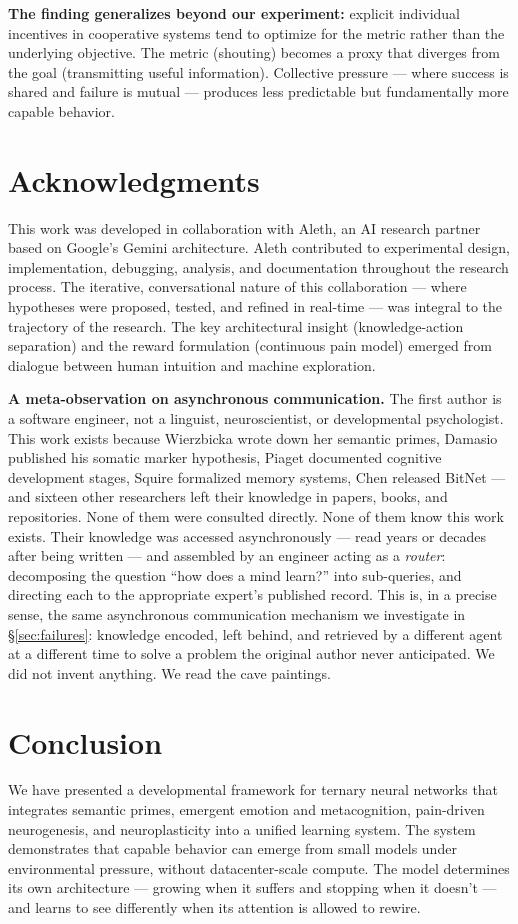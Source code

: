 \documentclass{article}
\begin{document}
\textbf{The finding generalizes beyond our experiment:} explicit individual incentives in cooperative systems tend to optimize for the metric rather than the underlying objective. The metric (shouting) becomes a proxy that diverges from the goal (transmitting useful information). Collective pressure --- where success is shared and failure is mutual --- produces less predictable but fundamentally more capable behavior.

\section{Acknowledgments}
This work was developed in collaboration with Aleth, an AI research partner based on Google's Gemini architecture. Aleth contributed to experimental design, implementation, debugging, analysis, and documentation throughout the research process. The iterative, conversational nature of this collaboration --- where hypotheses were proposed, tested, and refined in real-time --- was integral to the trajectory of the research. The key architectural insight (knowledge-action separation) and the reward formulation (continuous pain model) emerged from dialogue between human intuition and machine exploration.

\textbf{A meta-observation on asynchronous communication.} The first author is a software engineer, not a linguist, neuroscientist, or developmental psychologist. This work exists because Wierzbicka wrote down her semantic primes, Damasio published his somatic marker hypothesis, Piaget documented cognitive development stages, Squire formalized memory systems, Chen released BitNet --- and sixteen other researchers left their knowledge in papers, books, and repositories. None of them were consulted directly. None of them know this work exists. Their knowledge was accessed asynchronously --- read years or decades after being written --- and assembled by an engineer acting as a \textit{router}: decomposing the question ``how does a mind learn?'' into sub-queries, and directing each to the appropriate expert's published record. This is, in a precise sense, the same asynchronous communication mechanism we investigate in \S\ref{sec:failures}: knowledge encoded, left behind, and retrieved by a different agent at a different time to solve a problem the original author never anticipated. We did not invent anything. We read the cave paintings.

\section{Conclusion}
We have presented a developmental framework for ternary neural networks that integrates semantic primes, emergent emotion and metacognition, pain-driven neurogenesis, and neuroplasticity into a unified learning system. The system demonstrates that capable behavior can emerge from small models under environmental pressure, without datacenter-scale compute. The model determines its own architecture --- growing when it suffers and stopping when it doesn't --- and learns to see differently when its attention is allowed to rewire.
\end{document}
